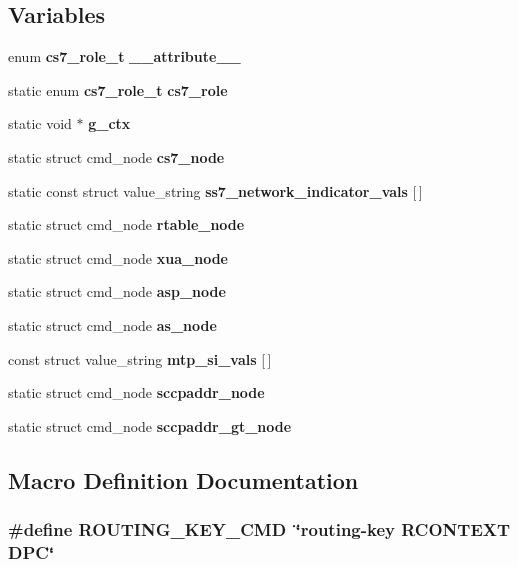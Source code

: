 \subsection*{Variables}
\begin{DoxyCompactItemize}
\item 
enum {\bf cs7\+\_\+role\+\_\+t} {\bf \+\_\+\+\_\+attribute\+\_\+\+\_\+}
\item 
static enum {\bf cs7\+\_\+role\+\_\+t} {\bf cs7\+\_\+role}
\item 
static void $\ast$ {\bf g\+\_\+ctx}
\item 
static struct cmd\+\_\+node {\bf cs7\+\_\+node}
\item 
static const struct value\+\_\+string {\bf ss7\+\_\+network\+\_\+indicator\+\_\+vals} [$\,$]
\item 
static struct cmd\+\_\+node {\bf rtable\+\_\+node}
\item 
static struct cmd\+\_\+node {\bf xua\+\_\+node}
\item 
static struct cmd\+\_\+node {\bf asp\+\_\+node}
\item 
static struct cmd\+\_\+node {\bf as\+\_\+node}
\item 
const struct value\+\_\+string {\bf mtp\+\_\+si\+\_\+vals} [$\,$]
\item 
static struct cmd\+\_\+node {\bf sccpaddr\+\_\+node}
\item 
static struct cmd\+\_\+node {\bf sccpaddr\+\_\+gt\+\_\+node}
\end{DoxyCompactItemize}


\subsection{Macro Definition Documentation}
\subsubsection[{R\+O\+U\+T\+I\+N\+G\+\_\+\+K\+E\+Y\+\_\+\+C\+MD}]{\setlength{\rightskip}{0pt plus 5cm}\#define R\+O\+U\+T\+I\+N\+G\+\_\+\+K\+E\+Y\+\_\+\+C\+MD~\char`\"{}routing-\/key R\+C\+O\+N\+T\+E\+XT D\+PC\char`\"{}}\label{osmo__ss7__vty_8c_a682f1914c7838dc08806b9da5110079f}
